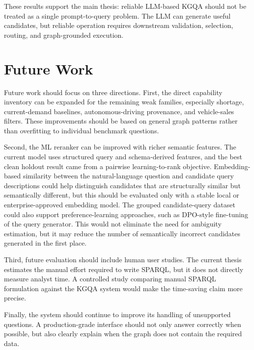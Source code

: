\documentclass[
  12pt,
  english,
  oneside]{report}
\begin{document}
These results support the main thesis: reliable LLM-based KGQA should not be treated as a single prompt-to-query problem. The LLM can generate useful candidates, but reliable operation requires downstream validation, selection, routing, and graph-grounded execution.

\section{Future Work}
\label{sec:future-work}

Future work should focus on three directions. First, the direct capability inventory can be expanded for the remaining weak families, especially shortage, current-demand baselines, autonomous-driving provenance, and vehicle-sales filters. These improvements should be based on general graph patterns rather than overfitting to individual benchmark questions.

Second, the ML reranker can be improved with richer semantic features. The current model uses structured query and schema-derived features, and the best clean holdout result came from a pairwise learning-to-rank objective. Embedding-based similarity between the natural-language question and candidate query descriptions could help distinguish candidates that are structurally similar but semantically different, but this should be evaluated only with a stable local or enterprise-approved embedding model. The grouped candidate-query dataset could also support preference-learning approaches, such as DPO-style fine-tuning of the query generator. This would not eliminate the need for ambiguity estimation, but it may reduce the number of semantically incorrect candidates generated in the first place.

Third, future evaluation should include human user studies. The current thesis estimates the manual effort required to write SPARQL, but it does not directly measure analyst time. A controlled study comparing manual SPARQL formulation against the KGQA system would make the time-saving claim more precise.

Finally, the system should continue to improve its handling of unsupported questions. A production-grade interface should not only answer correctly when possible, but also clearly explain when the graph does not contain the required data.
\end{document}
